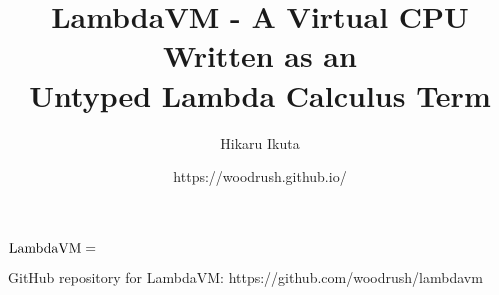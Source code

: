 \documentclass[article, 12pt]{article}
\title{LambdaVM - A Virtual CPU Written as an \\ Untyped Lambda Calculus Term}
\author{Hikaru Ikuta}
\date{https://woodrush.github.io/}
\begin{document}
\maketitle
${\rm LambdaVM} =$

\begin{thebibliography}{A99}
     GitHub repository for LambdaVM: https://github.com/woodrush/lambdavm
\end{thebibliography}
\end{document}
